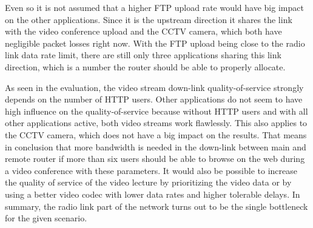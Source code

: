 \documentclass[a4paper,10pt]{book}\usepackage{graphicx}
\begin{document}
Even so it is not assumed that a higher FTP upload rate would have big impact on the other applications. Since it is the upstream direction it shares the link with the video conference upload and the CCTV camera, which both have negligible packet losses right now. With the FTP upload being close to the radio link data rate limit, there are still only three applications sharing this link direction, which is a number the router should be able to properly allocate.

As seen in the evaluation, the video stream down-link quality-of-service strongly depends on the number of HTTP users. Other applications do not seem to have high influence on the quality-of-service because without HTTP users and with all other applications active, both video streams work flawlessly. This also applies to the CCTV camera, which does not have a big impact on the results. That means in conclusion that more bandwidth is needed in the down-link between main and remote router if more than six users should be able to browse on the web during a video conference with these parameters. It would also be possible to increase the quality of service of the video lecture by prioritizing the video data or by using a better video codec with lower data rates and higher tolerable delays. In summary, the radio link part of the network turns out to be the single bottleneck for the given scenario. 

	
	
\end{document}
